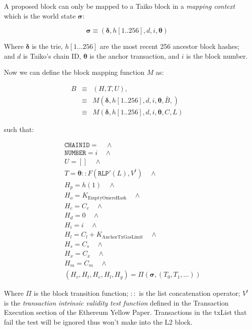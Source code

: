 \documentclass[9pt,oneside]{amsart}
\begin{document}
\begin{multicols}{2}
A proposed block can only be mapped to a Taiko block in a \textit{mapping context} which is the world state $\boldsymbol{\sigma}$:

$$\boldsymbol{\sigma} \equiv (\boldsymbol{\delta}, h[1..256], d, i, \boldsymbol{\theta})$$

Where $\boldsymbol{\delta}$ is the trie, $h[1...256]$ are the most recent 256 ancestor block hashes; and $d$ is Taiko's chain ID, $\boldsymbol{\theta}$ is the anchor transaction, and $i$ is the block number.

Now we can define the block mapping function $M$ as:

\begin{eqnarray}
B & \equiv & (H, T, U), \\
\nonumber & \equiv &  M(\boldsymbol{\delta}, h[1..256], {d}, i, \boldsymbol{\theta}, \bar{B}, )  \\
\nonumber & \equiv & M(\boldsymbol{\delta}, h[1..256], {d}, i, \boldsymbol{\theta}, C, L)
\end{eqnarray}


such that:

\begin{eqnarray}
& & \texttt{CHAINID}  = \quad \wedge \\
\nonumber& & \texttt{NUMBER} = {i} \quad \wedge \\
\nonumber& & U = [] \quad \wedge \\
\nonumber& & T =  \boldsymbol{\theta}::F(\texttt{RLP}'(L), V^t) \quad \wedge  \\
\nonumber& & H_p =  h(1) \quad \wedge \\
\nonumber& & H_o =   K_{\mathrm{EmptyOmersHash}} \quad \wedge \\
\nonumber& & H_c =   C_c \quad \wedge \\
\nonumber& & H_d =   0 \quad \wedge \\
\nonumber& & H_i =   i \quad \wedge \\
\nonumber& & H_l =   C_l + K_{\mathrm{AnchorTxGasLimit}} \quad \wedge \\
\nonumber& & H_s =   C_s \quad \wedge \\
\nonumber& & H_x =   C_x \quad \wedge \\
\nonumber& & H_m =   C_m \quad \wedge \\
\nonumber& & (H_r, H_t, H_e, H_l, H_g) =   \Pi(\boldsymbol{\sigma}, (T_0, T_1, ...))
\end{eqnarray}

Where $\Pi$ is the block transition function; $::$ is the list concatenation operator; $V^t$ is the \textit{transaction intrinsic validity test function} defined in the Transaction Execution section of the Ethereum Yellow Paper. Transactions in the txList that fail the test will be ignored thus won't make into the L2 block.



\end{multicols}
\end{document}
